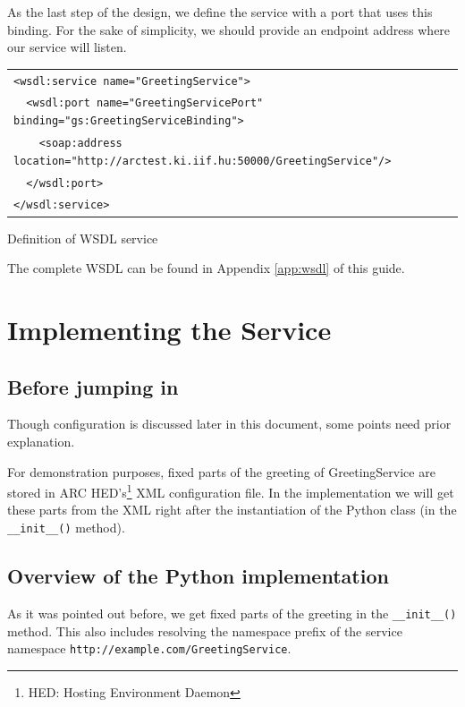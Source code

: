 \documentclass{article}
\begin{document}
As the last step of the design, we define the service with a port that 
uses this binding. For the sake of simplicity, we should provide an 
endpoint address where our service will listen.

\begin{illustration}
\begin{center}
\begin{tabular}{|l|}
\hline
\verb#<wsdl:service name="GreetingService">#\\
\verb#  <wsdl:port name="GreetingServicePort" binding="gs:GreetingServiceBinding">#\\
\verb#    <soap:address location="http://arctest.ki.iif.hu:50000/GreetingService"/>#\\
\verb#  </wsdl:port>#\\
\verb#</wsdl:service>#\\
\hline
\end{tabular}
\end{center}
\caption{Definition of WSDL service}
\end{illustration}

The complete WSDL can be found in Appendix \ref{app:wsdl} of this guide.

\clearpage
\newpage

\section{Implementing the Service}

\subsection{Before jumping in}

Though configuration is discussed later in this document, some points
need prior explanation.

For demonstration purposes, fixed parts of the greeting of
GreetingService are stored in ARC HED's\footnote[1]{HED: Hosting
  Environment Daemon} XML configuration file. In the implementation we
will get these parts from the XML right after the instantiation of the
Python class (in the \verb#__init__()# method).

\subsection{Overview of the Python implementation}

As it was pointed out before, we get fixed parts of the greeting in the
\verb#__init__()# method. This also includes resolving the namespace
prefix of the service namespace \verb#http://example.com/GreetingService#.
\end{document}
